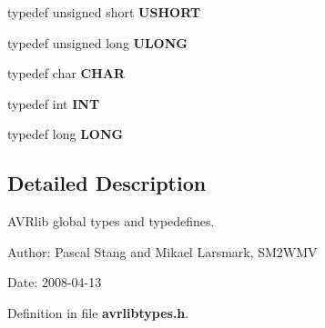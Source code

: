 \begin{CompactItemize}
\item 
typedef unsigned short \textbf{USHORT}\label{avrlibtypes_8h_5850d5316caf7f4cedd742fdf8cd7c02}

\item 
typedef unsigned long \textbf{ULONG}\label{avrlibtypes_8h_f632da489ebc3708ec3ab6791ee53fa4}

\item 
typedef char \textbf{CHAR}\label{avrlibtypes_8h_ebb9e13210d88d43e32e735ada43a425}

\item 
typedef int \textbf{INT}\label{avrlibtypes_8h_392e62da233ed3e2f7c3fd4f487a3896}

\item 
typedef long \textbf{LONG}\label{avrlibtypes_8h_2a3e0cda5f1249bef6db47c5eb8e3813}

\end{CompactItemize}


\subsection{Detailed Description}
AVRlib global types and typedefines. 

\begin{Desc}
\item[Author:]Pascal Stang and Mikael Larsmark, SM2WMV \end{Desc}
\begin{Desc}
\item[Date:]2008-04-13 \end{Desc}


Definition in file {\bf avrlibtypes.h}.